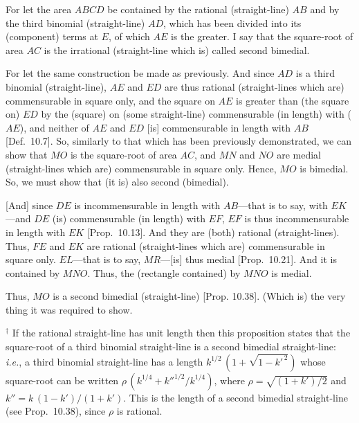\begin{Parallel}{}{}
{For let the area $ABCD$ be contained by the rational (straight-line)
$AB$ and by the third binomial (straight-line) $AD$, which has been divided into
its (component) terms at $E$, of which $AE$ is the greater.  I say that
the square-root of area $AC$ is the irrational (straight-line which is)
called second bimedial.

For let the same construction be made as  previously. And since
$AD$ is a third binomial (straight-line), $AE$ and $ED$
are thus rational (straight-lines which are) commensurable in square only,
and the square on $AE$ is greater than (the square on) $ED$
by the (square) on (some straight-line) commensurable (in length) with
($AE$), and neither of $AE$ and $ED$ [is] commensurable in length
with $AB$ [Def.~10.7]. So, similarly
to that which has been previously demonstrated, we can show that
$MO$ is the square-root of  area $AC$, and $MN$ and $NO$
are medial (straight-lines which are) commensurable in square only.
Hence, $MO$ is bimedial. So, we must show that (it is)
also second (bimedial).

\mbox{[}And] since $DE$ is incommensurable in length with $AB$---that is to say,
with $EK$---and $DE$ (is) commensurable (in length) with $EF$,
$EF$ is thus incommensurable in length with $EK$ [Prop.~10.13]. And they are (both)
rational (straight-lines). Thus, $FE$ and $EK$ are rational (straight-lines which are) commensurable in square only. $EL$---that is to say, $MR$---[is] thus medial [Prop.~10.21]. And it
is contained by $MNO$.  Thus, the (rectangle contained) by $MNO$
is medial.

Thus, $MO$ is a second bimedial (straight-line) [Prop. 10.38]. (Which is) the very thing it was required to show.}
\end{Parallel}
{\footnotesize\noindent $^\dag$ If the rational straight-line has unit length then this proposition states that the square-root of 
a third binomial straight-line is a second bimedial straight-line: {\em i.e.}, 
a third binomial straight-line has a length $k^{1/2}\,(1+\sqrt{1-{k'}^{\,2}})$ whose
square-root can be written $\rho\,(k^{1/4}+{k''}^{1/2}/k^{1/4})$, where $\rho=\sqrt{(1+k')/2}$ and $k''=k\,(1-k')/(1+k')$. This is the length of a second bimedial straight-line (see Prop.~10.38), since $\rho$ is rational.}

